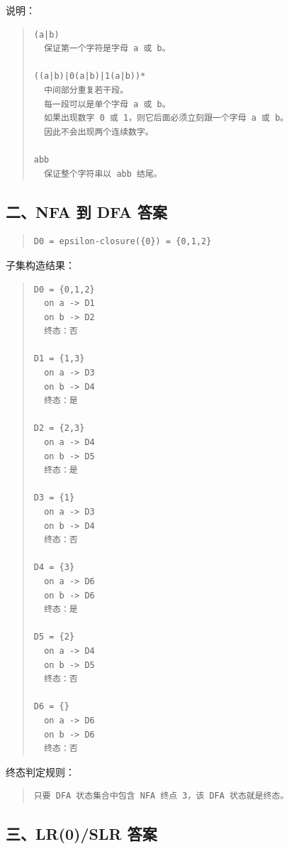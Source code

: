\documentclass[UTF8,zihao=-4]{ctexart}
\begin{document}
说明：

\begin{quote}
\footnotesize
\begin{verbatim}
(a|b)
  保证第一个字符是字母 a 或 b。

((a|b)|0(a|b)|1(a|b))*
  中间部分重复若干段。
  每一段可以是单个字母 a 或 b。
  如果出现数字 0 或 1，则它后面必须立刻跟一个字母 a 或 b。
  因此不会出现两个连续数字。

abb
  保证整个字符串以 abb 结尾。
\end{verbatim}
\end{quote}

\subsection*{二、NFA 到 DFA 答案}

\begin{quote}
\footnotesize
\begin{verbatim}
D0 = epsilon-closure({0}) = {0,1,2}
\end{verbatim}
\end{quote}

子集构造结果：

\begin{quote}
\footnotesize
\begin{verbatim}
D0 = {0,1,2}
  on a -> D1
  on b -> D2
  终态：否

D1 = {1,3}
  on a -> D3
  on b -> D4
  终态：是

D2 = {2,3}
  on a -> D4
  on b -> D5
  终态：是

D3 = {1}
  on a -> D3
  on b -> D4
  终态：否

D4 = {3}
  on a -> D6
  on b -> D6
  终态：是

D5 = {2}
  on a -> D4
  on b -> D5
  终态：否

D6 = {}
  on a -> D6
  on b -> D6
  终态：否
\end{verbatim}
\end{quote}

终态判定规则：

\begin{quote}
\footnotesize
\begin{verbatim}
只要 DFA 状态集合中包含 NFA 终点 3，该 DFA 状态就是终态。
\end{verbatim}
\end{quote}

\subsection*{三、LR(0)/SLR 答案}
\end{document}
